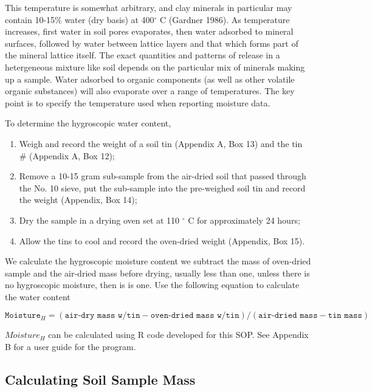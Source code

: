 \documentclass[12pt]{../SOP4_alpha}\usepackage[]{graphicx}\usepackage[]{xcolor}
\begin{document}
\NP This temperature is somewhat arbitrary, and clay minerals in particular may contain 10-15\% water (dry basis) at 400$^\circ$ C (Gardner 1986).  As temperature increases, first water in soil pores evaporates, then water adsorbed to mineral surfaces, followed by water between lattice layers and that which forms part of the mineral lattice itself.  The exact quantities and patterns of release in a hetergeneous mixture like soil depends on the particular mix of minerals making up a sample.  Water adsorbed to organic components (as well as other volatile organic substances) will also evaporate over a range of temperatures.  The key point is to specify the temperature used when reporting moisture data.

\NP To determine the hygroscopic water content,

\begin{enumerate}
	\item Weigh and record the weight of a soil tin (Appendix A, Box 13) and the tin \# (Appendix A, Box 12);
	\item Remove a 10-15 gram sub-sample from the air-dried soil that passed through the No. 10 sieve, put the sub-sample into the pre-weighed soil tin and record the weight (Appendix, Box 14);
	\item Dry the sample in a drying oven set at 110 $^\circ$ C for approximately 24 hours;
	\item Allow the tins to cool and record the oven-dried weight (Appendix, Box 15). 
\end{enumerate}

\NP We calculate the  hygroscopic moisture content we subtract the mass of oven-dried sample and the air-dried mass before drying, usually less than one, unless there is no hygroscopic moisture, then is is one. Use the following equation to calculate the water content

\begin{equation}
\texttt{Moisture}_H = (\texttt{air-dry mass w/tin} - \texttt{oven-dried mass w/tin})/(\texttt{air-dried mass} - \texttt{tin mass})
\end{equation}

\noindent $Moisture_H$ can be calculated using R code developed for this SOP. See Appendix B for a user guide for the program. 

\subsection{Calculating Soil Sample Mass}
\end{document}
